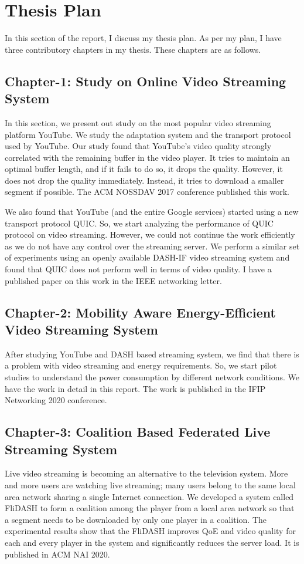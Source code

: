 \section{Thesis Plan}
In this section of the report, I discuss my thesis plan. As per my plan, I have three contributory chapters in my thesis. These chapters are as follows.

\subsection{Chapter-1: Study on Online Video Streaming System}
In this section, we present out study on the most popular video streaming platform YouTube. We study the adaptation system and the transport protocol used by YouTube. Our study found that YouTube's video quality strongly correlated with the remaining buffer in the video player. It tries to maintain an optimal buffer length, and if it fails to do so, it drops the quality. However, it does not drop the quality immediately. Instead, it tries to download a smaller segment if possible. The ACM NOSSDAV 2017 conference published this work.

We also found that YouTube (and the entire Google services) started using a new transport protocol QUIC. So, we start analyzing the performance of QUIC protocol on video streaming. However, we could not continue the work efficiently as we do not have any control over the streaming server. We perform a similar set of experiments using an openly available DASH-IF video streaming system and found that QUIC does not perform well in terms of video quality. I have a published paper on this work in the IEEE networking letter.

\subsection{Chapter-2: Mobility Aware Energy-Efficient Video Streaming System}
After studying YouTube and DASH based streaming system, we find that there is a problem with video streaming and energy requirements. So, we start pilot studies to understand the power consumption by different network conditions. We have the work in detail in this report. The work is published in the IFIP Networking 2020 conference.

\subsection{Chapter-3: Coalition Based Federated Live Streaming System}
Live video streaming is becoming an alternative to the television system. More and more users are watching live streaming; many users belong to the same local area network sharing a single Internet connection. We developed a system called FliDASH to form a coalition among the player from a local area network so that a segment needs to be downloaded by only one player in a coalition. The experimental results show that the FliDASH improves QoE and video quality for each and every player in the system and significantly reduces the server load. It is published in ACM NAI 2020.

